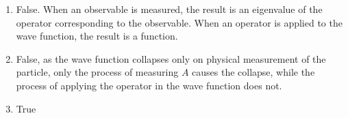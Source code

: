 \documentclass[fleqn, a4paper, 11pt, oneside]{amsart}
\theoremstyle{definition}
\theoremstyle{theorem}
\begin{document}
\begin{solution}
	\begin{enumerate}[leftmargin=*]
		\item
			False.
			When an observable is measured, the result is an eigenvalue of the operator corresponding to the observable.
			When an operator is applied to the wave function, the result is a function.
		\item
			False, as the wave function collapses only on physical measurement of the particle, only the process of measuring $A$ causes the collapse, while the process of applying the operator in the wave function does not.
		\item
			True
	\end{enumerate}
\end{solution}
\end{document}
